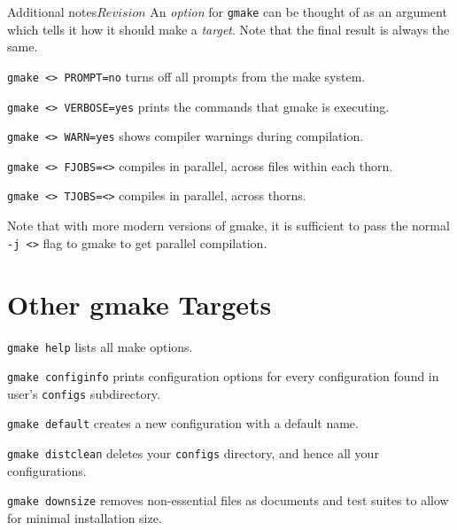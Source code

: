 \begin{cactuspart}{Additional notes}{}{$Revision$}
An \textit{option} for \texttt{gmake} can be thought of as an argument which tells
it how it should make a \textit{target}. Note that the final result is always
the same.

\begin{Lentry}
\item [\texttt{gmake <\var{target}> PROMPT=no}] turns off all prompts from the
make system.
\item [\texttt{gmake <\var{target}> VERBOSE=yes}] prints the commands that
gmake is executing.
\item [\texttt{gmake <\var{target}> WARN=yes}] shows compiler warnings during
compilation.
\item [\texttt{gmake <\var{target}> FJOBS=<\var{number}>}] compiles in parallel,
across files within each thorn.
\item [\texttt{gmake <\var{target}> TJOBS=<\var{number}>}] compiles in parallel,
across thorns.

\end{Lentry}

Note that with more modern versions of gmake, it is sufficient to pass the
normal \texttt{-j <>} flag to gmake to get parallel compilation.





\section{Other gmake Targets}

\begin{Lentry}

\item [\texttt{gmake help}] lists all make options.

\item [\texttt{gmake configinfo}] prints configuration options for every
configuration found in user's \texttt{configs} subdirectory.

\item [\texttt{gmake default}] creates a new configuration with a default name.

\item [\texttt{gmake distclean}] deletes your \texttt{configs} directory, and hence all your configurations.

\item [\texttt{gmake downsize}] removes non-essential files as documents
  and test suites to allow for minimal installation size.


\end{Lentry}
\end{cactuspart}
